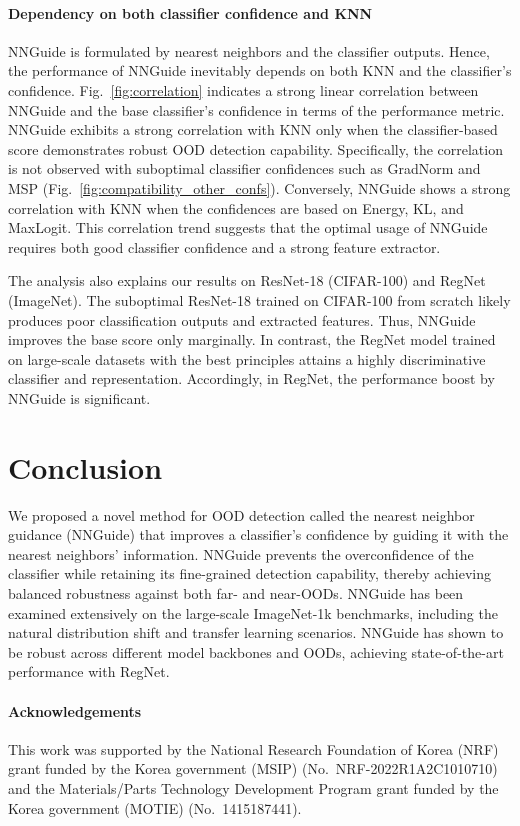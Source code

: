 \documentclass[10pt,twocolumn,letterpaper]{article}
\begin{document}
\paragraph{Dependency on both classifier confidence and KNN}
NNGuide is formulated by nearest neighbors and the classifier outputs. Hence, the performance of NNGuide inevitably depends on both KNN and the classifier's confidence.  
Fig.~\ref{fig:correlation} indicates a strong linear correlation between NNGuide and the base classifier's confidence in terms of the performance metric.
NNGuide exhibits a strong correlation with KNN only when the classifier-based score demonstrates robust OOD detection capability. Specifically, the correlation is not observed with suboptimal classifier confidences such as GradNorm and MSP (Fig.~\ref{fig:compatibility_other_confs}). Conversely, NNGuide shows a strong correlation with KNN when the confidences are based on Energy, KL, and MaxLogit.
This correlation trend suggests that the optimal usage of NNGuide requires both good classifier confidence and a strong feature extractor. 

The analysis also explains our results on ResNet-18 (CIFAR-100) and RegNet (ImageNet). The suboptimal ResNet-18 trained on CIFAR-100 from scratch likely produces poor classification outputs and extracted features. Thus, NNGuide improves the base score only marginally.
In contrast, the RegNet model trained on large-scale datasets with the best principles attains a highly discriminative classifier and representation. Accordingly, in RegNet, the performance boost by NNGuide is significant.


\section{Conclusion}

We proposed a novel method for OOD detection called the nearest neighbor guidance (NNGuide) that improves a classifier's confidence by guiding it with the nearest neighbors' information. NNGuide prevents the overconfidence of the classifier while retaining its fine-grained detection capability, thereby achieving balanced robustness against both far- and near-OODs. NNGuide has been examined extensively on the large-scale ImageNet-1k benchmarks, including the natural distribution shift and transfer learning scenarios. NNGuide has shown to be robust across different model backbones and OODs, achieving state-of-the-art performance with RegNet.

\paragraph{Acknowledgements}
This work was supported by the National Research Foundation of Korea (NRF) grant funded by the Korea government (MSIP) (No.~NRF-2022R1A2C1010710) and the Materials/Parts Technology Development Program grant funded by the Korea government (MOTIE) (No.~1415187441).
\end{document}
